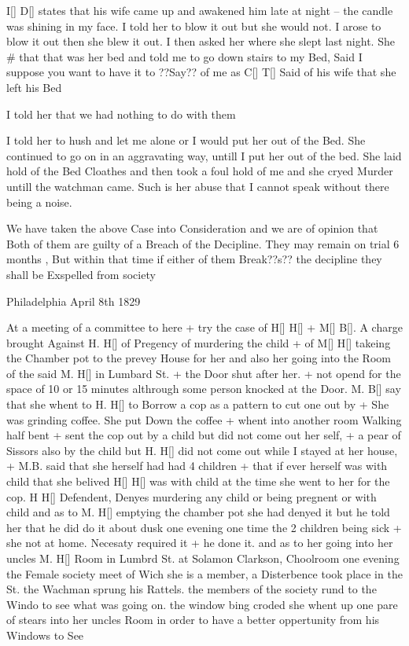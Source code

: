 \documentclass[output=paper,colorlinks,citecolor=brown]{langscibook}
\begin{document}
I[] D[] states that his wife came up and awakened him late at night --  the candle was shining in my face. I told her to blow it out but she would not. I arose to blow it out then she blew it out. I then asked her where she slept last night. She \# that that was her bed and told me to go down stairs to my Bed, Said I suppose you want to have it to ??Say?? of me as C[] T[] Said of his wife that she left his Bed

I told her that we had nothing to do with them

I told her to hush and let me alone or I would put her out of the Bed. She continued to go on in an aggravating way, untill I put her out of the bed. She laid hold of the Bed Cloathes and then took a foul hold of me and she cryed Murder untill the watchman came. Such is her abuse that I cannot speak without there being a noise.

  We have taken the above Case into Consideration and we are of opinion that Both of them are guilty of a Breach of the Decipline. They may remain on trial 6 months , But within that time if either of them Break??s?? the decipline they shall be Exspelled from society
\z


\ea%
    \label{ex:singler:4}
     
    

                                       Philadelphia April 8th 1829

At a meeting of a committee to here + try the case of H[] H[] + M[] B[]. A charge brought Against H. H[] of Pregency of murdering the child + of M[] H[] takeing the Chamber pot to the prevey House for her and also her going into the Room of the said M. H[] in Lumbard St. + the Door shut after her. + not opend for the space of 10 or 15 minutes althrough some person knocked at the Door. M. B[] say that she whent to H. H[] to Borrow a cop as a pattern to cut one out by + She was grinding coffee. She put Down the coffee + whent into another room Walking half bent + sent the cop out by a child but did not come out her self, + a pear of Sissors also by the child but H. H[] did not come out while I stayed at her house, + M.B. said that she herself had had 4 children + that if ever herself was with child that she belived H[] H[] was with child at the time she went to her for the cop. H H[] Defendent, Denyes murdering any child or being pregnent or with child and as to M. H[] emptying the chamber pot she had denyed it but he told her that he did do it about dusk one evening one time the 2 children being sick + she not at home. Necesaty required it + he done it. and as to her going into her uncles M. H[] Room in Lumbrd St. at Solamon Clarkson, Choolroom one evening the Female society meet of Wich she is a member, a Disterbence took place in the St. the Wachman sprung his Rattels. the members of the society rund to the Windo to see what was going on. the window bing croded she whent up one pare of stears into her uncles Room in order to have a better oppertunity from his Windows to See
\end{document}

